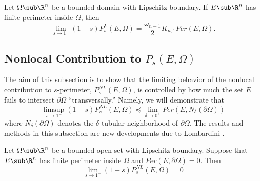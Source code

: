 \documentclass[../main.tex]{subfiles}
\begin{document}
\begin{proposition}
    Let $ \Omega\sub \R^{n} $ be a bounded domain with Lipschitz boundary. If $ E\sub \R^{n} $ has finite perimeter inside $ \Omega $, then
    \[
        \lim_{s\to1^{-}}(1-s)P_{s}^{L}(E,\Omega) = \frac{\omega_{n-1}}{2}K_{n,1}Per(E,\Omega).
    \]
\end{proposition}

\subsection{Nonlocal Contribution to $ P_{s}(E,\Omega) $}

The aim of this subsection is to show that the limiting behavior of the nonlocal contribution to $ s $-perimeter, $ P_{s}^{NL}(E,\Omega) $, is controlled by how much the set $ E $ fails to intersect $ \partial \Omega $ ``transversally.'' Namely, we will demonstrate that
\[
    \limsup_{s\to1^{-}}(1-s)P_{s}^{NL}(E,\Omega) \preceq \lim_{\delta\to0^{+}}Per(E,N_{\delta}(\partial \Omega))
\]
where $ N_{\delta}(\partial \Omega) $ denotes the $ \delta $-tubular neighborhood of $ \partial \Omega $. The results and methods in this subsection are new developments due to Lombardini \cite{lombardini:2019}.


\begin{proposition}
    Let $ \Omega\sub \R^{n} $ be a bounded open set with Lipschitz boundary. Suppose that $ E\sub \R^{n} $ has finite perimeter inside $ \Omega $ and $ Per(E,\partial \Omega) = 0 $. Then 
    \[
        \lim_{s\to1^{-}}(1-s) P_{s}^{NL}(E,\Omega) = 0 
    \]
\end{proposition}


\begin{wrapfigure}{r}{0.5\textwidth}
    \begin{center}
    
    \end{center}
    \vspace{-20mm} 
\end{wrapfigure}
\end{document}
